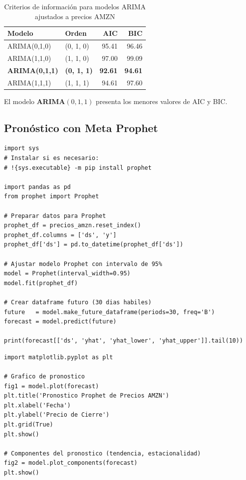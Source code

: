 \documentclass[12pt, a4paper]{article}
\begin{document}
\begin{table}[H]
  \centering
  \caption{Criterios de información para modelos ARIMA ajustados a precios AMZN}
  \label{tab:aic_bic_real}
  \begin{tabular}{llrr}
    \toprule
    \textbf{Modelo} & \textbf{Orden} & \textbf{AIC} & \textbf{BIC} \\
    \midrule
    ARIMA(0,1,0)          & (0, 1, 0) & 95.41 & 96.46 \\
    ARIMA(1,1,0)          & (1, 1, 0) & 97.00 & 99.09 \\
    \textbf{ARIMA(0,1,1)} & \textbf{(0, 1, 1)} & \textbf{92.61} & \textbf{94.61} \\
    ARIMA(1,1,1)          & (1, 1, 1) & 94.61 & 97.60 \\
    \bottomrule
  \end{tabular}
\end{table}

El modelo \textbf{ARIMA$(0,1,1)$} presenta los menores valores de AIC y BIC.

\subsection{Pronóstico con Meta Prophet}

\begin{lstlisting}
import sys
# Instalar si es necesario:
# !{sys.executable} -m pip install prophet

import pandas as pd
from prophet import Prophet

# Preparar datos para Prophet
prophet_df = precios_amzn.reset_index()
prophet_df.columns = ['ds', 'y']
prophet_df['ds'] = pd.to_datetime(prophet_df['ds'])

# Ajustar modelo Prophet con intervalo de 95%
model = Prophet(interval_width=0.95)
model.fit(prophet_df)

# Crear dataframe futuro (30 dias habiles)
future   = model.make_future_dataframe(periods=30, freq='B')
forecast = model.predict(future)

print(forecast[['ds', 'yhat', 'yhat_lower', 'yhat_upper']].tail(10))
\end{lstlisting}

\begin{lstlisting}
import matplotlib.pyplot as plt

# Grafico de pronostico
fig1 = model.plot(forecast)
plt.title('Pronostico Prophet de Precios AMZN')
plt.xlabel('Fecha')
plt.ylabel('Precio de Cierre')
plt.grid(True)
plt.show()

# Componentes del pronostico (tendencia, estacionalidad)
fig2 = model.plot_components(forecast)
plt.show()
\end{lstlisting}
\end{document}
